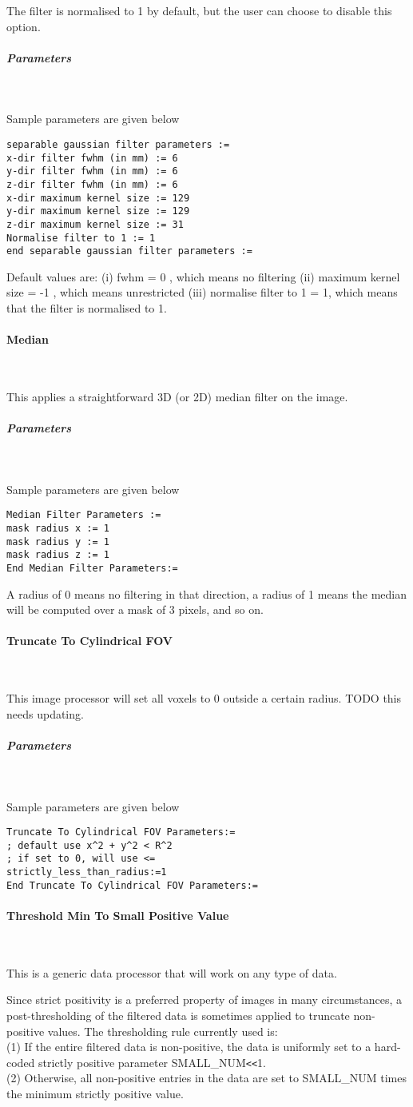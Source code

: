 \documentclass{article}
\newcommand{\tab}{\hspace{5mm}}
\newcommand{\subsubsubsection}[1]{\paragraph{#1}\mbox{} \\}
\newcommand{\subsubsubsubsection}[1]{\subparagraph{#1} \mbox{} \\}
\begin{document}
{{{The filter is normalised to 1 by default, but the user can choose to disable this option.


{ \subsubsubsubsection{Parameters}
}
Sample parameters are given below
\begin{verbatim}
separable gaussian filter parameters :=
x-dir filter fwhm (in mm) := 6
y-dir filter fwhm (in mm) := 6
z-dir filter fwhm (in mm) := 6
x-dir maximum kernel size := 129
y-dir maximum kernel size := 129
z-dir maximum kernel size := 31
Normalise filter to 1 := 1
end separable gaussian filter parameters :=
\end{verbatim}

Default values are:
(i) fwhm = 0 , which means no filtering
(ii) maximum kernel size = -1 , which means unrestricted
(iii) normalise filter to 1 = 1, which means that the filter is normalised to 1.

{ \subsubsubsection{Median}
}
\label{sec:median}
This applies a straightforward 3D (or 2D) median filter on the 
image.

{ \subsubsubsubsection{Parameters}
}
Sample parameters are given below
\begin{verbatim}
Median Filter Parameters := 
mask radius x := 1  
mask radius y := 1 
mask radius z := 1 
End Median Filter Parameters:=
\end{verbatim}


A radius of 0 means no filtering in that direction, a radius 
of 1 means the median will be computed over a mask of 3 pixels, 
and so on.


{ \subsubsubsection{Truncate To Cylindrical FOV}
}
This image processor will set all voxels to 0 outside a certain radius.
TODO this needs updating.
{ \subsubsubsubsection{Parameters}
}
Sample parameters are given below
\begin{verbatim}
Truncate To Cylindrical FOV Parameters:=
; default use x^2 + y^2 < R^2
; if set to 0, will use <=
strictly_less_than_radius:=1 
End Truncate To Cylindrical FOV Parameters:=
\end{verbatim}

{ \subsubsubsection{Threshold Min To Small Positive Value}
}
This is a generic data processor that will work on any type of data.

Since strict positivity is a preferred property of images in 
many circumstances, a post-thresholding of the filtered data 
is sometimes applied to truncate non-positive values. The thresholding 
rule currently used is:\\
(1)\tab 
If the entire filtered data is non-positive, the data is uniformly 
set to a hard-coded strictly positive parameter SMALL\_NUM\texttt{<}\texttt{<}1.\\
(2)\tab 
Otherwise, all non-positive entries in the data are set to SMALL\_NUM 
times the minimum strictly positive value.


}}}
\end{document}
